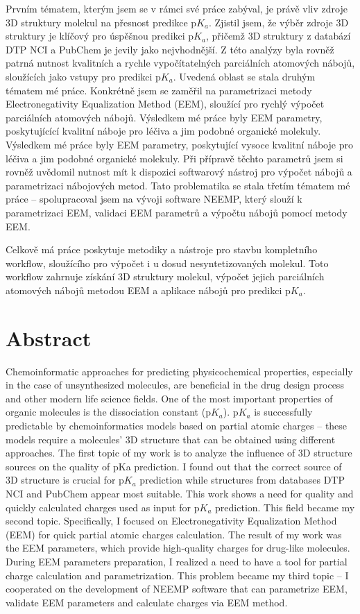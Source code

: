 \documentclass[11pt,b5paper,oneside,final]{book}
\begin{document}
Prvním tématem, kterým jsem se v rámci své práce zabýval, je právě vliv zdroje
3D struktury molekul na přesnost predikce p$K_a$. Zjistil jsem, že výběr zdroje
3D struktury je klíčový pro úspěšnou predikci p$K_a$, přičemž 3D struktury
z databází DTP NCI a PubChem je jevily jako nejvhodnější. Z této analýzy byla
rovněž patrná nutnost kvalitních a rychle vypočítatelných parciálních atomových
nábojů, sloužících jako vstupy pro predikci p$K_a$. Uvedená oblast se stala
druhým tématem mé práce. Konkrétně jsem se zaměřil na parametrizaci metody
Electronegativity Equalization Method (EEM), sloužící pro rychlý vý\-po\-čet
parciálních atomových nábojů. Výsledkem mé práce byly EEM parametry,
poskytujícící kvalitní náboje pro léčiva a jim podobné organické molekuly.
Výsledkem mé práce byly EEM parametry, poskytující vysoce kvalitní náboje pro
léčiva a jim podobné organické molekuly. Při přípravě těchto parametrů jsem si
rovněž uvědomil nutnost mít k dispozici softwarový nástroj pro výpočet nábojů a
pa\-ra\-me\-tri\-za\-ci nábojových metod. Tato problematika se stala třetím tématem mé
práce -- spo\-lu\-pra\-co\-val jsem na vývoji software NEEMP, který slouží
k parametrizaci EEM, validaci EEM parametrů a výpočtu nábojů pomocí metody EEM.

Celkově má práce poskytuje metodiky a nástroje pro stavbu kompletního workflow,
sloužícího pro výpočet i u dosud nesyntetizovaných molekul. Toto workflow
zahrnuje získání 3D struktury molekul, výpočet jejich parciálních atomových
nábojů metodou EEM a aplikace nábojů pro predikci p$K_a$.
\clearpage

\section*{Abstract}
Chemoinformatic approaches for predicting physicochemical properties, especially
in the case of unsynthesized molecules, are beneficial in the drug design
process and other modern life science fields. One of the most important
properties of organic molecules is the dissociation constant (p$K_a$). p$K_a$ is
successfully predictable by chemoinformatics models based on partial atomic
charges -- these models require a molecules’ 3D structure that can be obtained
using different approaches. The first topic of my work is to analyze
the influence of 3D structure sources on the quality of pKa prediction. I found
out that the correct source of 3D structure is crucial for p$K_a$ prediction
while structures from databases DTP NCI and PubChem appear most suitable. This
work shows a need for quality and quickly calculated charges used as input for
p$K_a$ prediction. This field became my second topic. Specifically, I focused
on Electronegativity Equalization Method (EEM) for quick partial atomic charges
calculation. The result of my work was the EEM parameters, which provide
high-quality charges for drug-like molecules. During EEM parameters preparation,
I realized a need to have a tool for partial charge calculation and
parametrization. This problem became my third topic -- I cooperated
on the development of NEEMP software that can parametrize EEM, validate EEM
parameters and calculate charges via EEM method.
\end{document}
